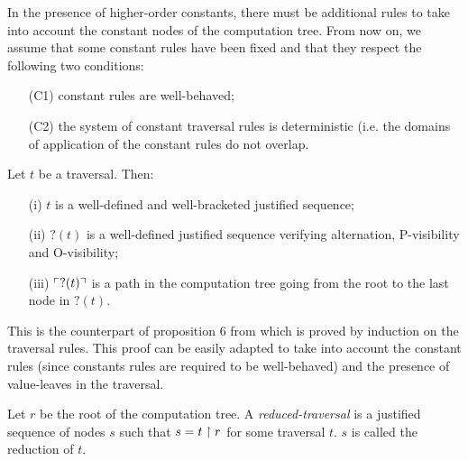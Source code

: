 In the presence of higher-order constants, there must be additional rules to take into account the
constant nodes of the computation tree.
From now on, we assume that some constant rules have been fixed and that they respect the following two conditions:
\begin{itemize}
  \item[(C1)] constant rules are well-behaved;
  \item[(C2)] the system of constant traversal rules is deterministic (i.e. the domains of application of the
  constant rules do not overlap.
\end{itemize}


\begin{prop}
\label{prop:pviewtrav_is_path}
Let $t$ be a traversal. Then:
\begin{itemize}
\item[(i)] $t$ is a well-defined and well-bracketed justified sequence;
\item[(ii)] $?(t)$ is a well-defined justified sequence verifying alternation, P-visibility and O-visibility;
\item[(iii)] $\ulcorner ?(t) \urcorner$ is a path in the computation tree going from the root to the last node in $?(t)$.
\end{itemize}
\end{prop}
This is the counterpart of proposition 6 from \cite{OngHoMchecking2006} which is proved by induction on the traversal rules.
This proof can be easily adapted to take into account the constant rules (since constants rules are required to be well-behaved)
and the presence of value-leaves in the traversal.



\begin{dfn}
Let $r$ be the root of the computation tree. A \emph{reduced-traversal} is a justified sequence of nodes $s$ such that
$s = t \upharpoonright r$ for some traversal $t$. $s$ is called the reduction of $t$.
\end{dfn}


